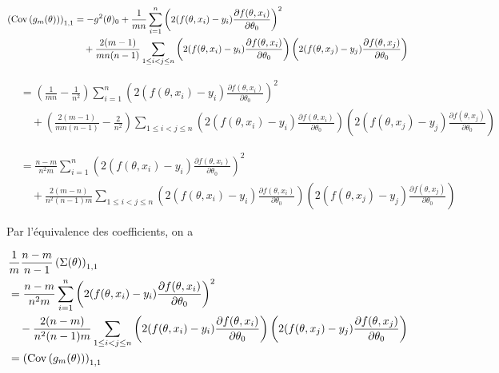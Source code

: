 \documentclass[a4paper,12pt]{article}
\begin{document}
\begin{align*}
	\left({\rm Cov} \left( g_{m}(\theta) \right)\right)_{1, 1} &= -g^2(\theta)_0 + \frac{1}{mn} \sum^{n}_{i = 1} \left(2(f(\theta, x_i) - y_i) \frac{\partial f(\theta, x_i)}{\partial \theta_0}\right)^2 \\
	&\quad + \frac{2(m-1)}{mn(n-1)} \sum_{1 \leq i < j \leq n} \left(2(f(\theta, x_i) - y_i) \frac{\partial f(\theta, x_i)}{\partial \theta_0}\right) \left(2(f(\theta, x_j) - y_j) \frac{\partial f(\theta, x_j)}{\partial \theta_0}\right)
\end{align*}


\begin{align*}
	&= \left(\frac{1}{mn} - \frac{1}{n^2}\right) \sum^{n}_{i = 1} \left(2(f(\theta, x_i) - y_i) \frac{\partial f(\theta, x_i)}{\partial \theta_0}\right)^2 \\
	&\quad + \left( \frac{2(m-1)}{mn(n-1)}  - \frac{2}{n^2} \right) \sum_{1 \leq i < j \leq n} \left(2(f(\theta, x_i) - y_i) \frac{\partial f(\theta, x_i)}{\partial \theta_0}\right) \left(2(f(\theta, x_j) - y_j) \frac{\partial f(\theta, x_j)}{\partial \theta_0}\right)
\end{align*}


\begin{align*}
	&= \frac{n - m}{n^2m} \sum^{n}_{i = 1} \left(2(f(\theta, x_i) - y_i) \frac{\partial f(\theta, x_i)}{\partial \theta_0}\right)^2 \\
	&\quad + \frac{2 (m - n)}{n^2(n - 1)m} \sum_{1 \leq i < j \leq n} \left(2(f(\theta, x_i) - y_i) \frac{\partial f(\theta, x_i)}{\partial \theta_0}\right) \left(2(f(\theta, x_j) - y_j) \frac{\partial f(\theta, x_j)}{\partial \theta_0}\right)
\end{align*}


Par l'équivalence des coefficients, on a

\begin{align*}
	&\frac{1}{m} \frac{n - m}{n - 1} \left( \Sigma(\theta) \right)_{1, 1} \\
	&= \frac{n - m}{n^2m} \sum^{n}_{i = 1} \left(2(f(\theta, x_i) - y_i) \frac{\partial f(\theta, x_i)}{\partial \theta_0}\right)^2 \\
	&\quad - \frac{2 (n - m)}{n^2(n - 1)m} \sum_{1 \leq i < j \leq n} \left(2(f(\theta, x_i) - y_i) \frac{\partial f(\theta, x_i)}{\partial \theta_0}\right) \left(2(f(\theta, x_j) - y_j) \frac{\partial f(\theta, x_j)}{\partial \theta_0}\right) \\
	&= \left({\rm Cov} \left( g_{m}(\theta) \right)\right)_{1, 1}
\end{align*}
\end{document}

